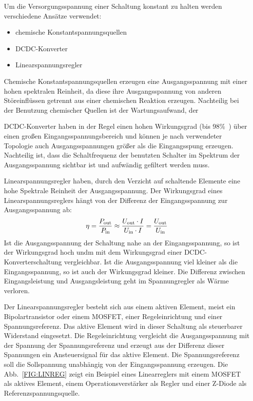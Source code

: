 Um die Versorgungsspannung einer Schaltung konstant zu halten werden 
verschiedene Ansätze verwendet:

\begin{itemize}
  \item chemische Konstantspannungsquellen
  \item DCDC-Konverter
  \item Linearspannungsregler
\end{itemize}

Chemische Konstantspannungsquellen erzeugen eine Ausgangsspannung mit einer 
hohen spektralen Reinheit, da diese ihre Ausgangsspannung von anderen 
Störeinflüssen getrennt aus einer chemischen Reaktion erzeugen.
Nachteilig bei der Benutzung chemischer Quellen ist der Wartungsaufwand, der

DCDC-Konverter haben in der Regel einen hohen Wirkungsgrad (bis 
98\%~\cite[Industr.com]{Webp:DCDC98}) über einen großen
Eingangsspannungsbereich und können je nach verwendeter Topologie auch 
Ausgangsspannungen größer als die Eingangsspung erzeugen.
Nachteilig ist, dass die Schaltfrequenz der benutzten Schalter im Spektrum der
Ausgangsspannung sichtbar ist und aufwändig gefiltert werden muss.

Linearspannungsregler haben, durch den Verzicht auf schaltende Elemente eine
hohe Spektrale Reinheit der Ausgangsspannung.
Der Wirkungsgrad eines Linearspannungsreglers hängt von der Differenz der 
Eingangsspannung zur Ausgangsspannung ab:
\[\eta = \frac{P_{\rm out}}{P_{\rm in}} \approx \frac{U_{\rm out} 
\cdot I}{U_{\rm in} \cdot I} = \frac{U_{\rm out}}{U_{\rm in}}\]
Ist die Ausgangsspannung der Schaltung nahe an der Eingangsspannung,
so ist der Wirkungsgrad hoch undm mit dem Wirkungsgrad einer 
DCDC-Konverterschaltung vergleichbar. Ist die Ausgangsspannung viel kleiner als die
Eingangsspannung, so ist auch der Wirkungsgrad kleiner.
Die Differenz zwischen Eingangsleistung und Ausgangsleistung geht im 
Spannungregler als Wärme verloren. 

Der Linearspannungsregler besteht sich aus einem aktiven Element, meist ein 
Bipolartransistor oder einem MOSFET, einer Regeleinrichtung und einer 
Spannungsreferenz.
Das aktive Element wird in dieser Schaltung als steuerbarer Widerstand 
eingesetzt.
Die Regeleinrichtung vergleicht die Ausgangsspannung mit der Spannung der 
Spannungsreferenz und erzeugt aus der Differenz dieser Spannungen ein 
Ansteuersignal für das aktive Element.
Die Spannungsreferenz soll die Sollspannung unabhängig von der Eingangsspannung
erzeugen.
Die Abb.~\ref{FIG:LINREG} zeigt ein Beispiel eines Linearreglers mit einem
MOSFET als aktives Element, einem Operationsverstärker als Regler und einer
Z-Diode als Referenzspannungsquelle.

